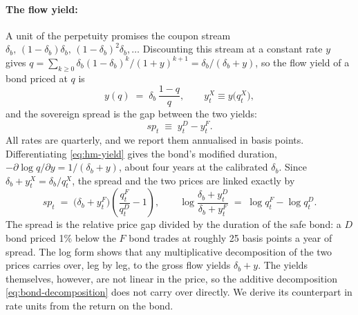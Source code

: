 \paragraph{The flow yield:}
A unit of the \cite{Hatchondo2009} perpetuity promises the coupon stream
$\delta_b,\,(1-\delta_b)\delta_b,\,(1-\delta_b)^2\delta_b,\dots$ Discounting this
stream at a constant rate $y$ gives
$q=\sum_{k\ge0}\delta_b(1-\delta_b)^k/(1+y)^{k+1}=\delta_b/(\delta_b+y)$, so the
flow yield of a bond priced at $q$ is
\begin{equation}
y(q)\;=\;\delta_b\,\frac{1-q}{q},
\qquad
y^{X}_t\equiv y\bigl(q^{X}_t\bigr),
\label{eq:hm-yield}
\end{equation}
and the sovereign spread is the gap between the two yields:
\begin{equation}
sp_t\;\equiv\;y^{D}_t-y^{F}_t .
\label{eq:spread-def}
\end{equation}
All rates are quarterly, and we report them annualised in basis points.
Differentiating \eqref{eq:hm-yield} gives the bond's modified duration,
$-\partial\log q/\partial y=1/(\delta_b+y)$, about four years at the calibrated
$\delta_b$. Since $\delta_b+y^{X}_t=\delta_b/q^{X}_t$, the spread and the two
prices are linked exactly by
\begin{equation}
sp_t\;=\;\bigl(\delta_b+y^{F}_t\bigr)\left(\frac{q^{F}_t}{q^{D}_t}-1\right),
\qquad
\log\frac{\delta_b+y^{D}_t}{\delta_b+y^{F}_t}\;=\;\log q^{F}_t-\log q^{D}_t .
\label{eq:spread-prices}
\end{equation}
The spread is the relative price gap divided by the duration of the safe bond:
a $D$ bond priced 1\% below the $F$ bond trades at roughly 25 basis points a year
of spread. The log form shows that any multiplicative decomposition of the two
prices carries over, leg by leg, to the gross flow yields $\delta_b+y$. The
yields themselves, however, are not linear in the price, so the additive
decomposition \eqref{eq:bond-decomposition} does not carry over directly. We
derive its counterpart in rate units from the return on the bond.

